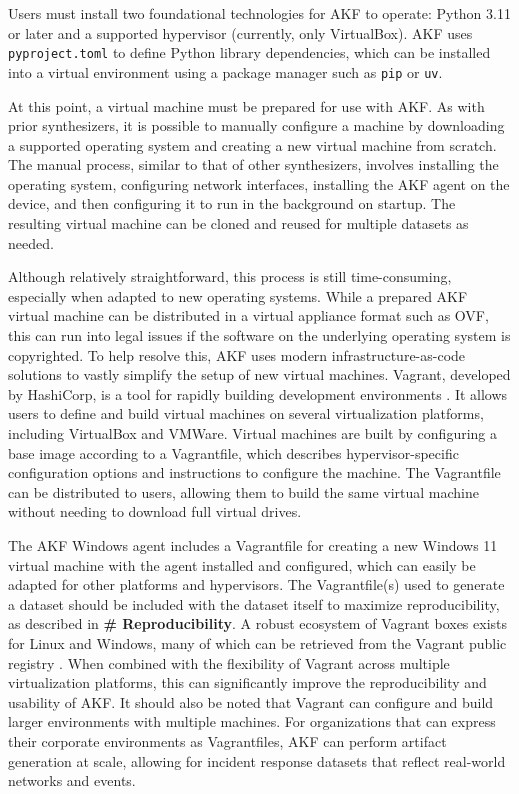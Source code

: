 \documentclass[final,5p,times,twocolumn]{elsarticle}
\newcommand{\passthrough}[1]{#1}
\begin{document}
Users must install two foundational technologies for AKF to operate:
Python 3.11 or later and a supported hypervisor (currently, only
VirtualBox). AKF uses \passthrough{\lstinline!pyproject.toml!} to define
Python library dependencies, which can be installed into a virtual
environment using a package manager such as
\passthrough{\lstinline!pip!} or \passthrough{\lstinline!uv!}.

At this point, a virtual machine must be prepared for use with AKF. As
with prior synthesizers, it is possible to manually configure a machine
by downloading a supported operating system and creating a new virtual
machine from scratch. The manual process, similar to that of other
synthesizers, involves installing the operating system, configuring
network interfaces, installing the AKF agent on the device, and then
configuring it to run in the background on startup. The resulting
virtual machine can be cloned and reused for multiple datasets as
needed.

Although relatively straightforward, this process is still
time-consuming, especially when adapted to new operating systems. While
a prepared AKF virtual machine can be distributed in a virtual appliance
format such as OVF, this can run into legal issues if the software on
the underlying operating system is copyrighted. To help resolve this,
AKF uses modern infrastructure-as-code solutions to vastly simplify the
setup of new virtual machines. Vagrant, developed by HashiCorp, is a
tool for rapidly building development environments
\cite{HashicorpVagrant2025}. It allows users to define and build
virtual machines on several virtualization platforms, including
VirtualBox and VMWare. Virtual machines are built by configuring a base
image according to a Vagrantfile, which describes hypervisor-specific
configuration options and instructions to configure the machine. The
Vagrantfile can be distributed to users, allowing them to build the same
virtual machine without needing to download full virtual drives.

The AKF Windows agent includes a Vagrantfile for creating a new Windows
11 virtual machine with the agent installed and configured, which can
easily be adapted for other platforms and hypervisors. The
Vagrantfile(s) used to generate a dataset should be included with the
dataset itself to maximize reproducibility, as described in \textbf{\#
Reproducibility}. A robust ecosystem of Vagrant boxes exists for Linux
and Windows, many of which can be retrieved from the Vagrant public
registry \cite{hashicorpHashiCorpCloudPlatform}. When combined with
the flexibility of Vagrant across multiple virtualization platforms,
this can significantly improve the reproducibility and usability of AKF.
It should also be noted that Vagrant can configure and build larger
environments with multiple machines. For organizations that can express
their corporate environments as Vagrantfiles, AKF can perform artifact
generation at scale, allowing for incident response datasets that
reflect real-world networks and events.
\end{document}
